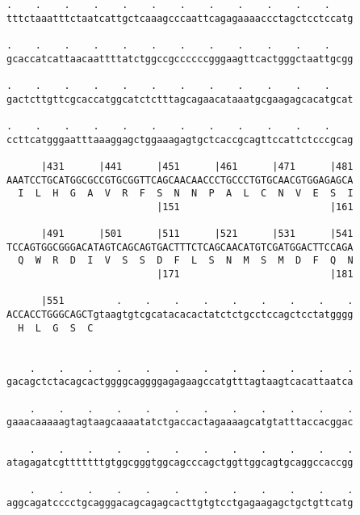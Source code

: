 \documentclass{article}
\begin{document}
\begin{Verbatim}
.    .    .    .    .    .    .    .    .    .    .    .    
tttctaaatttctaatcattgctcaaagcccaattcagagaaaaccctagctcctccatg
                                                            
.    .    .    .    .    .    .    .    .    .    .    .    
gcaccatcattaacaattttatctggccgccccccgggaagttcactgggctaattgcgg
                                                            
.    .    .    .    .    .    .    .    .    .    .    .    
gactcttgttcgcaccatggcatctctttagcagaacataaatgcgaagagcacatgcat
                                                            
.    .    .    .    .    .    .    .    .    .    .    .    
ccttcatgggaatttaaaggagctggaaagagtgctcaccgcagttccattctcccgcag
                                                            
      |431      |441      |451      |461      |471      |481
AAATCCTGCATGGCGCCGTGCGGTTCAGCAACAACCCTGCCCTGTGCAACGTGGAGAGCA
  I  L  H  G  A  V  R  F  S  N  N  P  A  L  C  N  V  E  S  I
                          |151                          |161
  
      |491      |501      |511      |521      |531      |541
TCCAGTGGCGGGACATAGTCAGCAGTGACTTTCTCAGCAACATGTCGATGGACTTCCAGA
  Q  W  R  D  I  V  S  S  D  F  L  S  N  M  S  M  D  F  Q  N
                          |171                          |181
  
      |551         .    .    .    .    .    .    .    .    .
ACCACCTGGGCAGCTgtaagtgtcgcatacacactatctctgcctccagctcctatgggg
  H  L  G  S  C                                             
                                                            
  
    .    .    .    .    .    .    .    .    .    .    .    .
gacagctctacagcactggggcaggggagagaagccatgtttagtaagtcacattaatca
                                                            
    .    .    .    .    .    .    .    .    .    .    .    .
gaaacaaaaagtagtaagcaaaatatctgaccactagaaaagcatgtatttaccacggac
                                                            
    .    .    .    .    .    .    .    .    .    .    .    .
atagagatcgtttttttgtggcgggtggcagcccagctggttggcagtgcaggccaccgg
                                                            
    .    .    .    .    .    .    .    .    .    .    .    .
aggcagatcccctgcagggacagcagagcacttgtgtcctgagaagagctgctgttcatg
                                                            

\end{Verbatim}
\end{document}
